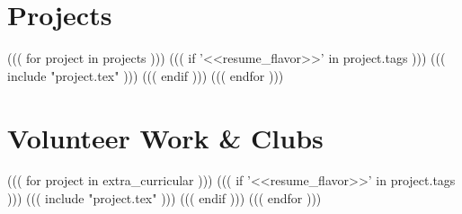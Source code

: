 \documentclass[letterpaper]{article}
\newcommand\textstyleMainColor[1]{\textcolor{headerMainColor}{#1}}
\begin{document}
\clearpage

\section{\textstyleMainColor{Projects}}
{\color{headerMainColor}{\hrule height 0.2pt}}
\vspace{2pt}
((( for project in projects )))
((( if '<<resume_flavor>>' in project.tags )))
((( include "project.tex" )))
((( endif )))
((( endfor )))

\section{\textstyleMainColor{Volunteer Work \& Clubs}}
{\color{headerMainColor}{\hrule height 0.2pt}}
\vspace{2pt}
((( for project in extra_curricular )))
((( if '<<resume_flavor>>' in project.tags )))
((( include "project.tex" )))
((( endif )))
((( endfor )))
\end{document}
